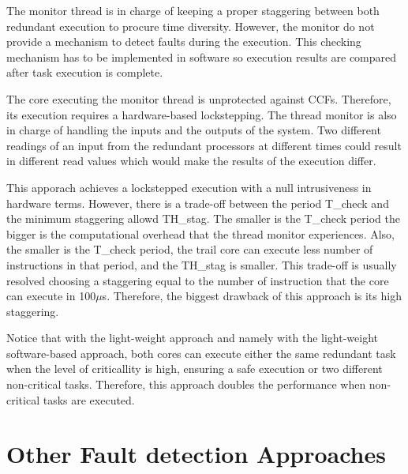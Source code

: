 The monitor thread is in charge of keeping a proper staggering between both redundant execution to procure time diversity. However, the monitor do not provide a mechanism to detect faults during the execution. This checking mechanism has to be implemented in software so execution results are compared after task execution is complete.

The core executing the monitor thread is unprotected against CCFs. Therefore, its execution requires a hardware-based lockstepping. The thread monitor is also in charge of handling the inputs and the outputs of the system. Two different readings of an input from the redundant processors at different times could result in different read values which would make the results of the execution differ.  

This apporach achieves a lockstepped execution with a null intrusiveness in hardware terms. However, there is a trade-off between the period T\_check and the minimum staggering allowd TH\_stag. The smaller is the T\_check period the bigger is the computational overhead that the thread monitor experiences. Also, the smaller is the T\_check period, the trail core can execute less number of instructions in that period, and the TH\_stag is smaller. This trade-off is usually resolved choosing a staggering equal to the number of instruction that the core can execute in 100$\mu$s. Therefore, the biggest drawback of this approach is its high staggering.

Notice that with the light-weight approach and namely with the light-weight software-based approach, both cores can execute either the same redundant task when the level of criticallity is high, ensuring a safe execution or two different non-critical tasks. Therefore, this approach doubles the performance when non-critical tasks are executed.





\section{Other Fault detection Approaches}


